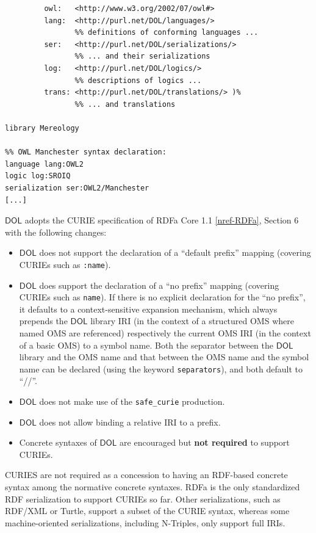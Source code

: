 \documentclass[10pt, a4paper]{isov2}
\makeatletter
\newcommand*\CommentAuthor{}
\renewcommand*\CommentAuthor{#1}}
\newcommand*\CommentDate{}
\renewcommand*\CommentDate{#1}}
\newcommand*\CommentId{}
\renewcommand*\CommentId{#1}}
\newcommand*\CommentType{}
\renewcommand*\CommentType{#1}}
\newcommand*{\SetCommentColorByType}[1]{%
\edef\localType{{#1}}%
\expandafter\ifstrequal\localType{q-aut}{\colorlet{CommentColor}{red}}{%
\expandafter\ifstrequal\localType{q-all}{\colorlet{CommentColor}{orange}}{%
\expandafter\ifstrequal\localType{todo}{\colorlet{CommentColor}{orange}}{%
\expandafter\ifstrequal\localType{fyi}{\colorlet{CommentColor}{lightgray}}{%
\colorlet{CommentColor}{yellow}}}}}}
\newcommand*{\SetCommentPrefixByType}[1]{%
\edef\localType{{#1}}%
\expandafter\@ifmtarg\localType{%
\edef\CommentPrefix{}%
}{%
\caseupper[q]{#1}%
\edef\CommentPrefix{\thestring: }%
}}
\newcommand*{\initComment}[1]{%
\setkeys{Comment}{#1}%
\SetCommentColorByType{\CommentType}%
\relax%
\SetCommentPrefixByType{\CommentType}%
\relax%
}
\newcommand*{\todonote}[2][]{%
\initComment{#1}%
\pdfcomment[author=\CommentAuthor,color=CommentColor,date=\CommentDate,id=\CommentId]{%
\CommentPrefix
#2}}
\renewcommand*{\todonote}[2][]{%
\initComment{#1}%
\ednote{\CommentPrefix #2}}
\newcommand*{\CLnote}[2][author=Christoph Lange]{%
\todonote[author=Christoph Lange,#1]{#2}}
\newcommand*{\syntax}[1]{\texttt{#1}}
\newcommand*{\notrequired}{\textbf{not required}\xspace}
\newcommand*{\DOL}{\ensuremath{\mathsf{DOL}}\xspace}
\renewcommand{\noterefname}{note}
\renewcommand{\nref}[1]{\noterefname~\ref{#1}}
\renewcommand{\nref}[1]{\ref{nref-#1}}
\makeatother
\begin{document}
\begin{lstlisting}[basicstyle=\ttfamily,language=dolText,escapechar=@,mathescape]
%prefix( :      <http://www.example.org/mereology#>
         owl:   <http://www.w3.org/2002/07/owl#>
         lang:  <http://purl.net/DOL/languages/>
                %% definitions of conforming languages ...
         ser:   <http://purl.net/DOL/serializations/>
                %% ... and their serializations
         log:   <http://purl.net/DOL/logics/>
                %% descriptions of logics ...
         trans: <http://purl.net/DOL/translations/> )%
                %% ... and translations

library Mereology

%% OWL Manchester syntax declaration:
language lang:OWL2 
logic log:SROIQ 
serialization ser:OWL2/Manchester
[...]
\end{lstlisting}


\DOL adopts the CURIE specification of RDFa Core 1.1 \nref{RDFa}, Section 6 with the following changes:
\begin{itemize}[noitemsep]
\item \DOL does not support the declaration of a ``default prefix'' mapping %
(covering CURIEs such as \syntax{:name}).
\item \DOL does support the declaration  of a ``no prefix'' mapping (covering CURIEs such as
\syntax{name}). If there is no explicit declaration for the ``no prefix'', it defaults to a
context-sensitive expansion mechanism, which always prepends the \DOL library IRI (in the context of a
structured OMS where named OMS are referenced) respectively the current OMS IRI (in the context of a basic
OMS) to a symbol name. Both the separator between the \DOL library and the OMS name and that between the
OMS name and the symbol name can be declared (using the keyword \syntax{separators}), and both default to ``//''.

\item \DOL does not make use of the \syntax{safe\_curie} production.
\item \DOL does not allow binding a relative IRI to a prefix.
\item Concrete syntaxes of \DOL are encouraged but \notrequired to support CURIEs.
\end{itemize}

{CURIES are not required as
a concession to having an RDF-based concrete syntax among the normative concrete syntaxes.  RDFa is
the only standardized RDF serialization to support CURIEs so far.  Other serializations, such as
RDF/XML or Turtle, support a subset of the CURIE syntax, whereas some machine-oriented
serializations, including N-Triples, only support full IRIs.}
\end{document}

